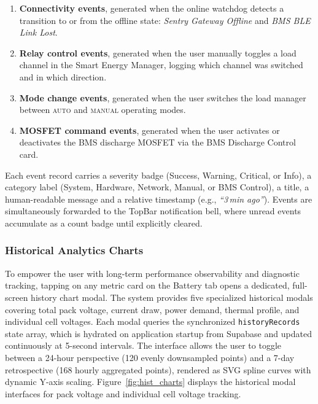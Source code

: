 \documentclass[12pt, a4paper]{report}
\begin{document}
{\begin{enumerate}
\item \textbf{Connectivity events}, generated when the online
watchdog detects a transition to or from the offline state:
\textit{Sentry Gateway Offline} and \textit{BMS BLE Link Lost}.

\item \textbf{Relay control events}, generated when the user
manually toggles a load channel in the Smart Energy Manager, logging
which channel was switched and in which direction.

\item \textbf{Mode change events}, generated when the user switches
the load manager between \textsc{auto} and \textsc{manual} operating
modes.

\item \textbf{MOSFET command events}, generated when the user
activates or deactivates the BMS discharge MOSFET via the BMS
Discharge Control card.


\end{enumerate}

Each event record carries a severity badge (Success, Warning, Critical,
or Info), a category label (System, Hardware, Network, Manual, or BMS
Control), a title, a human-readable message and a relative timestamp
(e.g., \textit{``3\,min ago''}). Events are simultaneously forwarded to
the TopBar notification bell, where unread events accumulate as a count
badge until explicitly cleared.
\subsubsection{Historical Analytics Charts}

To empower the user with long-term performance observability and diagnostic tracking, tapping on any metric card on the Battery tab opens a dedicated, full-screen history chart modal. The system provides five specialized historical modals covering total pack voltage, current draw, power demand, thermal profile, and individual cell voltages. Each modal queries the synchronized \texttt{historyRecords} state array, which is hydrated on application startup from Supabase and updated continuously at 5-second intervals. The interface allows the user to toggle between a 24-hour perspective (120 evenly downsampled points) and a 7-day retrospective (168 hourly aggregated points), rendered as SVG spline curves with dynamic Y-axis scaling. Figure~\ref{fig:hist_charts} displays the historical modal interfaces for pack voltage and individual cell voltage tracking.

}
\end{document}
